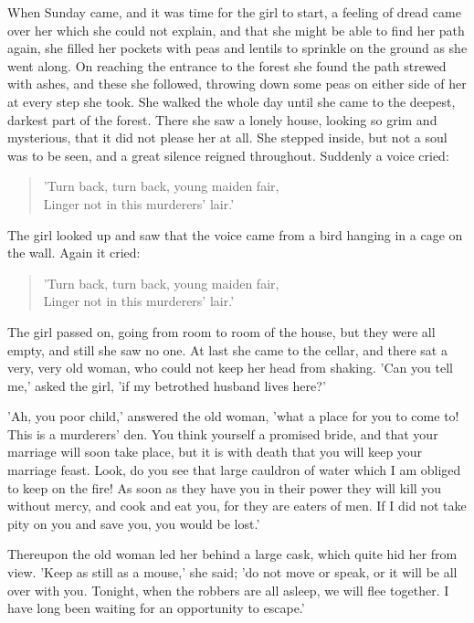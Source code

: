 \documentclass[12pt]{book}
\begin{document}
When Sunday came, and it was time for the girl to start, a feeling of
dread came over her which she could not explain, and that she might be
able to find her path again, she filled her pockets with peas and
lentils to sprinkle on the ground as she went along. On reaching the
entrance to the forest she found the path strewed with ashes, and
these she followed, throwing down some peas on either side of her at
every step she took. She walked the whole day until she came to the
deepest, darkest part of the forest. There she saw a lonely house,
looking so grim and mysterious, that it did not please her at all. She
stepped inside, but not a soul was to be seen, and a great silence
reigned throughout. Suddenly a voice cried:

\begin{verse}
 'Turn back, turn back, young maiden fair,\\
  Linger not in this murderers' lair.'
\end{verse}

The girl looked up and saw that the voice came from a bird hanging in
a cage on the wall. Again it cried:

\begin{verse}
 'Turn back, turn back, young maiden fair,\\
  Linger not in this murderers' lair.'
\end{verse}

The girl passed on, going from room to room of the house, but they
were all empty, and still she saw no one. At last she came to the
cellar, and there sat a very, very old woman, who could not keep her
head from shaking. 'Can you tell me,' asked the girl, 'if my betrothed
husband lives here?'

'Ah, you poor child,' answered the old woman, 'what a place for you to
come to! This is a murderers' den. You think yourself a promised
bride, and that your marriage will soon take place, but it is with
death that you will keep your marriage feast. Look, do you see that
large cauldron of water which I am obliged to keep on the fire! As
soon as they have you in their power they will kill you without mercy,
and cook and eat you, for they are eaters of men. If I did not take
pity on you and save you, you would be lost.'

Thereupon the old woman led her behind a large cask, which quite hid
her from view. 'Keep as still as a mouse,' she said; 'do not move or
speak, or it will be all over with you. Tonight, when the robbers are
all asleep, we will flee together. I have long been waiting for an
opportunity to escape.'
\end{document}
